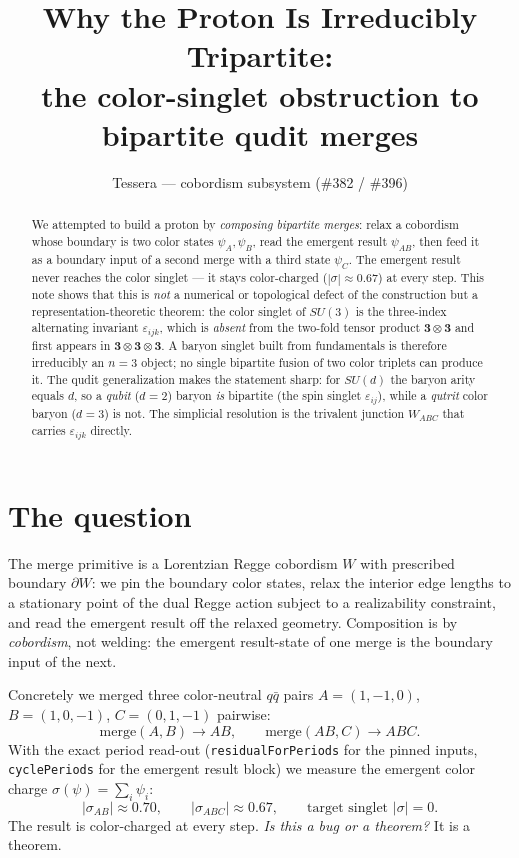 \documentclass[11pt]{article}
\title{\bf Why the Proton Is Irreducibly Tripartite:\\
the color-singlet obstruction to bipartite qudit merges}
\author{Tessera --- cobordism subsystem (\#382 / \#396)}
\date{}
\theoremstyle{definition}
\newcommand{\rep}[1]{\mathbf{#1}}      %
\newcommand{\sigmacol}{\sigma}         %
\begin{document}
\maketitle

\begin{abstract}
We attempted to build a proton by \emph{composing bipartite merges}: relax a
cobordism whose boundary is two color states $\psi_A,\psi_B$, read the emergent
result $\psi_{AB}$, then feed it as a boundary input of a second merge with a
third state $\psi_C$. The emergent result never reaches the color singlet --- it
stays color-charged ($|\sigmacol|\approx 0.67$) at every step. This note shows
that this is \emph{not} a numerical or topological defect of the construction but
a representation-theoretic theorem: the color singlet of $SU(3)$ is the
three-index alternating invariant $\varepsilon_{ijk}$, which is \emph{absent}
from the two-fold tensor product $\rep{3}\otimes\rep{3}$ and first appears in
$\rep{3}\otimes\rep{3}\otimes\rep{3}$. A baryon singlet built from fundamentals
is therefore irreducibly an $n=3$ object; no single bipartite fusion of two
color triplets can produce it. The qudit generalization makes the statement
sharp: for $SU(d)$ the baryon arity equals $d$, so a \emph{qubit} ($d=2$) baryon
\emph{is} bipartite (the spin singlet $\varepsilon_{ij}$), while a \emph{qutrit}
color baryon ($d=3$) is not. The simplicial resolution is the trivalent junction
$W_{ABC}$ that carries $\varepsilon_{ijk}$ directly.
\end{abstract}

\section{The question}

The merge primitive is a Lorentzian Regge cobordism $W$ with prescribed boundary
$\partial W$: we pin the boundary color states, relax the interior edge lengths
to a stationary point of the dual Regge action subject to a realizability
constraint, and read the emergent result off the relaxed geometry. Composition
is by \emph{cobordism}, not welding: the emergent result-state of one merge is
the boundary input of the next.

Concretely we merged three color-neutral $q\bar q$ pairs
$A=(1,-1,0)$, $B=(1,0,-1)$, $C=(0,1,-1)$ pairwise:
\[
  \text{merge}(A,B)\to AB,\qquad \text{merge}(AB,C)\to ABC .
\]
With the exact period read-out (\texttt{residualForPeriods} for the pinned
inputs, \texttt{cyclePeriods} for the emergent result block) we measure the
emergent color charge $\sigmacol(\psi)=\sum_i\psi_i$:
\[
  |\sigmacol_{AB}|\approx 0.70,\qquad |\sigmacol_{ABC}|\approx 0.67,
  \qquad\text{target singlet } |\sigmacol|=0 .
\]
The result is color-charged at every step. \emph{Is this a bug or a theorem?}
It is a theorem.
\end{document}
